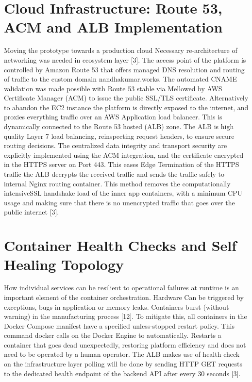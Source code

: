 \documentclass[conference]{IEEEtran}
\begin{document}
\section{Cloud Infrastructure: Route 53, ACM and  ALB Implementation}
Moving the prototype towards a production cloud Necessary re-architecture of networking was needed in ecosystem layer [3]. The access point of the platform is controlled by Amazon Route 53 that offers managed DNS resolution and routing of traffic to the custom domain nandhakumar.works. The automated CNAME validation was made possible with Route 53 stable via Mellowed by AWS Certificate Manager (ACM) to issue the public SSL/TLS certificate. Alternatively to abandon the EC2 instance the platform is directly exposed to the internet, and proxies everything  traffic over an AWS Application load balancer. This is dynamically connected to the Route 53 hosted (ALB) zone. The ALB is high quality Layer 7 load balancing, reinspecting request headers, to ensure secure routing decisions. The centralized data integrity and transport security are explicitly implemented using the ACM integration, and the certificate  encrypted in the HTTPS server on Port 443. This eases Edge Termination of the HTTPS traffic the ALB decrypts the received traffic and sends the traffic safely to internal Nginx routing container. This method removes the computationally intensiveSSL handshake load of the inner app containers, with a minimum CPU usage and making sure that there is no unencrypted traffic that goes over the public internet [3].


\section{Container Health Checks and Self Healing Topology}
How individual services can be resilient to operational failures at runtime is an important element of the container orchestration. Hardware Can be triggered by exceptions, bugs in application or memory leaks. Containers burst (without warning) in the manufacturing process [12]. To mitigate this, all containers in the Docker Compose manifest have a specified unless-stopped restart policy. This command docker calls on the Docker Engine to automatically. Restarts a container that goes dead unexpectedly, restoring platform efficiency and does not need to be operated by a human operator. The ALB makes use of health check on the infrastructure layer polling will be done by sending HTTP GET requests to the dedicated health endpoint of the backend API after every 30 seconds [3].
\end{document}
